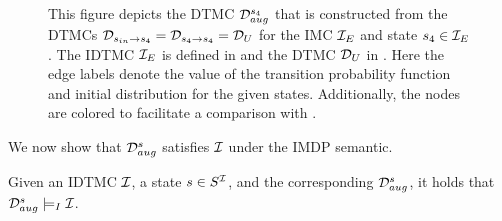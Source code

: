 \begin{figure}[h]
\begin{tikzpicture}
\end{tikzpicture}
\caption{This figure depicts the DTMC $\mathcal{D}^{s_4}_{aug}$ that is constructed from the DTMCs $\mathcal{D}_{s_{in}\rightarrow s_4} = \mathcal{D}_{s_4\rightarrow s_4} = \mathcal{D}_U$ for the IMC $\mathcal{I}_E$ and state $s_4 \in \mathcal{I}_E$. The IDTMC $\mathcal{I}_E$ is defined in  and the DTMC $\mathcal{D}_U$ in . Here the edge labels denote the value of the transition probability function and initial distribution for the given states. Additionally, the nodes are colored to facilitate a comparison with .}
\label{fig:MC_aug_mapping}
\end{figure}

We now show that $\mathcal{D}^s_{aug}$ satisfies $\mathcal{I}$ under the IMDP semantic.
\begin{lemma}
    Given an IDTMC $\mathcal{I}$, a state $s\in S^{\mathcal{I}}$, and the corresponding $\mathcal{D}_{aug}^s$, it holds that $\mathcal{D}_{aug}^s\models_{I} \mathcal{I}$.
\end{lemma}

